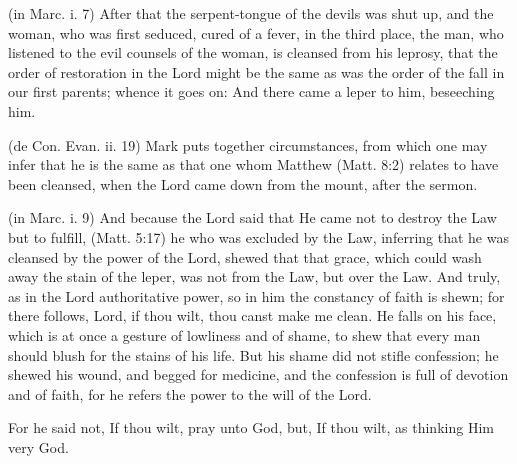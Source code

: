  

 (in Marc. i. 7) After that the serpent-tongue of the devils was shut up, and the woman, who was first seduced, cured of a fever, in the third place, the man, who listened to the evil counsels of the woman, is cleansed from his leprosy, that the order of restoration in the Lord might be the same as was the order of the fall in our first parents; whence it goes on: And there came a leper to him, beseeching him.

 (de Con. Evan. ii. 19) Mark puts together circumstances, from which one may infer that he is the same as that one whom Matthew (Matt. 8:2) relates to have been cleansed, when the Lord came down from the mount, after the sermon.

 (in Marc. i. 9) And because the Lord said that He came not to destroy the Law but to fulfill, (Matt. 5:17) he who was excluded by the Law, inferring that he was cleansed by the power of the Lord, shewed that that grace, which could wash away the stain of the leper, was not from the Law, but over the Law. And truly, as in the Lord authoritative power, so in him the constancy of faith is shewn; for there follows, Lord, if thou wilt, thou canst make me clean. He falls on his face, which is at once a gesture of lowliness and of shame, to shew that every man should blush for the stains of his life. But his shame did not stifle confession; he shewed his wound, and begged for medicine, and the confession is full of devotion and of faith, for he refers the power to the will of the Lord.

 For he said not, If thou wilt, pray unto God, but, If thou wilt, as thinking Him very God.

